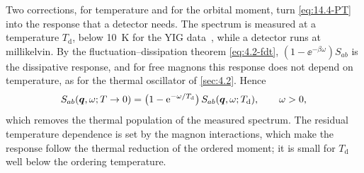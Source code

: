 Two corrections, for temperature and for the orbital moment, turn \cref{eq:14.4-PT} into the response that a detector needs. The spectrum is measured at a temperature $T_{\mathrm{d}}$, below \SI{10}{K} for the YIG data~\cite[App.~B\,2]{berlin2025determining}, while a detector runs at millikelvin. By the fluctuation--dissipation theorem \cref{eq:4.2-fdt}, $(1 - \ee^{-\beta\omega})S_{ab}$ is the dissipative response, and for free magnons this response does not depend on temperature, as for the thermal oscillator of \cref{sec:4.2}. Hence
\begin{equation*}
  S_{ab}(\bm{q},\omega;T \to 0) = \bigl(1 - \mathrm{e}^{-\omega/T_{\mathrm{d}}}\bigr)\,S_{ab}(\bm{q},\omega;T_{\mathrm{d}}) , \qquad \omega > 0 ,
\end{equation*}
which removes the thermal population of the measured spectrum. The residual temperature dependence is set by the magnon interactions, which make the response follow the thermal reduction of the ordered moment; it is small for $T_{\mathrm{d}}$ well below the ordering temperature.


